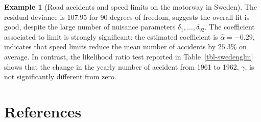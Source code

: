 \documentclass[
  11pt,
  letterpaper,
]{scrbook}
\theoremstyle{definition}
\newtheorem{example}{Example}[chapter]
\theoremstyle{definition}
\theoremstyle{remark}
\begin{document}
\begin{example}[Road accidents and speed limits on the motorway in
Sweden]
\begin{table}

\caption{\label{tbl-swedenglm}Analysis of deviance table (Type 3
decomposition) for the Poisson regression model fitted to the Sweden
traffic restrictions data: the table gives the \(p\)-value for
likelihood ratio tests comparing the full model including all covariates
with models in which a single explanatory is removed.}


\end{table}%

The residual deviance is 107.95 for 90 degrees of freedom, suggests the
overall fit is good, despite the large number of nuisance parameters
\(\delta_1, \ldots, \delta_{92}\). The coefficient associated to limit
is strongly significant: the estimated coefficient is
\(\widehat{\alpha}=-0.29\), indicates that speed limits reduce the mean
number of accidents by \(25.3\)\% on average. In contrast, the
likelihood ratio test reported in Table~\ref{tbl-swedenglm} shows that
the change in the yearly number of accident from 1961 to 1962,
\(\gamma\), is not significantly different from zero.

\end{example}


\chapter{References}\label{references}
\end{document}

